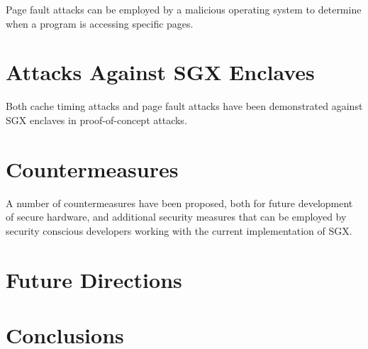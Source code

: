 Page fault attacks can be employed by a malicious operating system to determine when a program is accessing specific pages.

\section{Attacks Against SGX Enclaves}

Both cache timing attacks and page fault attacks have been demonstrated against SGX enclaves in proof-of-concept attacks. 

\section{Countermeasures}

A number of countermeasures have been proposed, both for future development of secure hardware, and additional security measures that can be employed by security conscious developers working with the current implementation of SGX.

\section{Future Directions}

\section{Conclusions}
